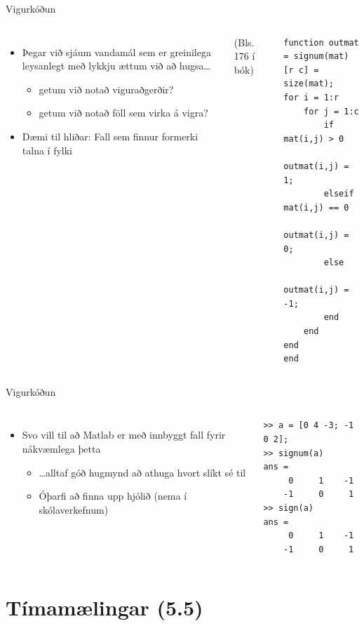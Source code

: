 \documentclass{beamer}
\begin{document}
\begin{frame}[fragile]{Vigurkóðun}
\begin{columns}
\begin{itemize}
 \item Þegar við sjáum vandamál sem er greinilega leysanlegt með lykkju ættum við að hugsa\ldots
 \begin{itemize}
  \item getum við notað viguraðgerðir?
  \item getum við notað föll sem virka á vigra?
 \end{itemize}
 \item Dæmi til hliðar: Fall sem finnur formerki talna í fylki
\end{itemize}
(Bls. 176 í bók)
\begin{verbatim}
function outmat = signum(mat)
[r c] = size(mat);
for i = 1:r
    for j = 1:c
        if mat(i,j) > 0
            outmat(i,j) = 1;
        elseif mat(i,j) == 0
            outmat(i,j) = 0;
        else
            outmat(i,j) = -1;
        end
    end
end
end
\end{verbatim}
\end{columns}
\end{frame}

\begin{frame}[fragile]{Vigurkóðun}
\begin{columns}
\begin{itemize}
 \item Svo vill til að Matlab er með innbyggt fall fyrir nákvæmlega þetta
 \begin{itemize}
  \item \ldots alltaf góð hugmynd að athuga hvort slíkt sé til
  \item Óþarfi að finna upp hjólið (nema í skólaverkefnum)
 \end{itemize}
\end{itemize}
\begin{verbatim}
>> a = [0 4 -3; -1 0 2];
>> signum(a)
ans =
     0     1    -1
    -1     0     1
>> sign(a)
ans =
     0     1    -1
    -1     0     1
\end{verbatim}
\end{columns}
\end{frame}

\section{Tímamælingar (5.5)}
\end{document}
